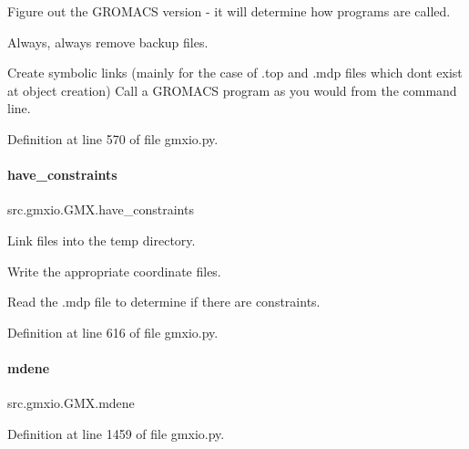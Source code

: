 Figure out the G\+R\+O\+M\+A\+CS version -\/ it will determine how programs are called. 

Always, always remove backup files.

Create symbolic links (mainly for the case of .top and .mdp files which don\textquotesingle{}t exist at object creation) Call a G\+R\+O\+M\+A\+CS program as you would from the command line. 

Definition at line 570 of file gmxio.\+py.

\mbox{\label{classsrc_1_1gmxio_1_1GMX_a9f08fa57b1b204a3e7c77b01aae38989}} 
\paragraph{\texorpdfstring{have\+\_\+constraints}{have\_constraints}}
{\footnotesize\ttfamily src.\+gmxio.\+G\+M\+X.\+have\+\_\+constraints}



Link files into the temp directory. 

Write the appropriate coordinate files.

Read the .mdp file to determine if there are constraints.

Definition at line 616 of file gmxio.\+py.

\mbox{\label{classsrc_1_1gmxio_1_1GMX_a9480881bb53654a82cf1b9abf736b123}} 
\paragraph{\texorpdfstring{mdene}{mdene}}
{\footnotesize\ttfamily src.\+gmxio.\+G\+M\+X.\+mdene}



Definition at line 1459 of file gmxio.\+py.

\mbox{\label{classsrc_1_1gmxio_1_1GMX_af9738ed7d8f41cbf3287e2688bcb708d}} 
